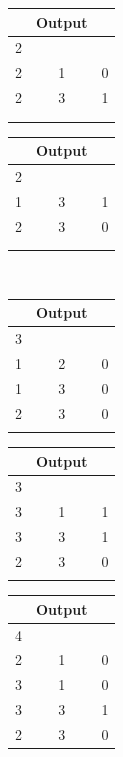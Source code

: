 \documentclass[11pt, a4paper, twoside]{article}
\begin{document}
\begin{samepage}
\begin{ejemplo}
 \begin{center}
	\begin{minipage}{0.3\textwidth}
			\begin{tabular}{ccc}
				   & Output\\
				   \hline
				   2 &   &   \\
				   2 & 1 & 0 \\
				   2 & 3 & 1 \\
				   \\
				   \\
			\end{tabular}
	\end{minipage} 	
	\begin{minipage}{0.3\textwidth}
			\begin{tabular}{ccc}
				   & Output\\
				   \hline
				   2 &   &   \\
				   1 & 3 & 1 \\
				   2 & 3 & 0 \\
				   \\
				   \\
			\end{tabular}
	\end{minipage} 	\\
	\begin{minipage}{0.3\textwidth}
			\begin{tabular}{ccc}
				   & Output\\
				   \hline
				   3 &   &   \\
				   1 & 2 & 0 \\
				   1 & 3 & 0 \\
				   2 & 3 & 0 \\
				   \\
			\end{tabular}
	\end{minipage} 	
	\begin{minipage}{0.3\textwidth}
			\begin{tabular}{ccc}
				   & Output\\
				   \hline
				   3 &   &   \\
				   3 & 1 & 1 \\
				   3 & 3 & 1 \\
				   2 & 3 & 0 \\
				   \\
			\end{tabular}
	\end{minipage} 	
	\begin{minipage}{0.3\textwidth}
			\begin{tabular}{ccc}
				   & Output\\
				   \hline
				   4 &   &   \\
				   2 & 1 & 0 \\
				   3 & 1 & 0 \\
				   3 & 3 & 1 \\
				   2 & 3 & 0 \\
			\end{tabular}
	\end{minipage} 	
\end{center}	


\end{ejemplo}
\end{samepage}
\end{document}
